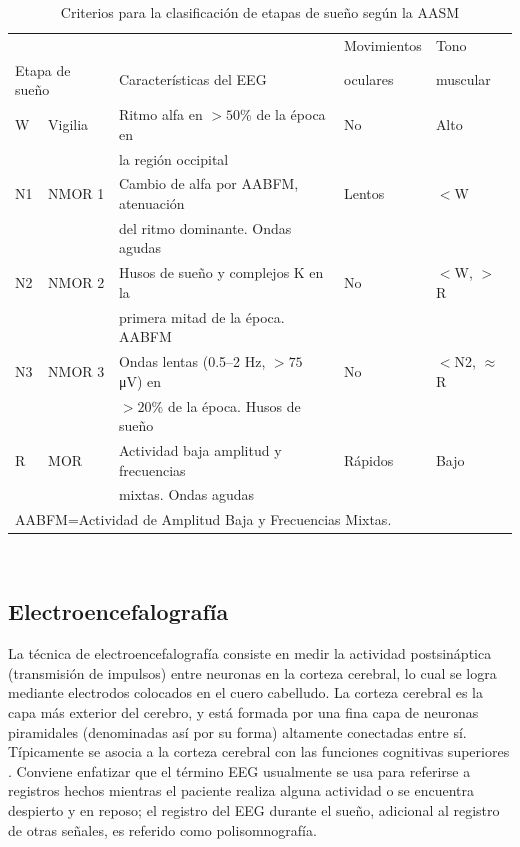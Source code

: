 \documentclass[12pt,letterpaper]{book}
\newcommand{\hz}{\si{\hertz}\xspace}
\newcommand{\mv}{\si{\micro\volt}\xspace}
\begin{document}
\begin{table}
\caption[Criterios para la clasificación de etapas de sueño]
{Criterios para la clasificación de etapas de sueño según la AASM}
\centering
{\small
\begin{tabular}{lllll}
\toprule
&&   & Movimientos & Tono \\
\multicolumn{2}{l}{Etapa de sueño}& Características del EEG & oculares & muscular \\
\midrule
 W  & Vigilia & {Ritmo alfa} en $>50$\% de la época en   & No & Alto \\
    &         & la región occipital                &    &      \\
 N1 & NMOR 1  & Cambio de alfa por AABFM, atenuación & Lentos & $<$W     \\
    &         & del ritmo dominante. Ondas agudas   &    &      \\
 N2 & NMOR 2  & Husos de sueño y complejos K en la    & No & $<$W, $>$R     \\
    &         & primera mitad de la época. AABFM &    &     \\
 N3 & NMOR 3  & {Ondas lentas} (0.5--2 \hz, $>75$ \mv) en& No & $<$N2, $\approx$R \\
    &         & $>20$\% de la época. Husos de sueño       &&      \\
 R  & MOR     & Actividad baja amplitud y frecuencias & Rápidos & Bajo  \\
    &         & mixtas. Ondas agudas             &       &       \\
\bottomrule
\multicolumn{4}{l}{AABFM=Actividad de Amplitud Baja y Frecuencias Mixtas.}
\end{tabular}\\
}
\label{cuadro:aasm}
\end{table}


\subsection{Electroencefalografía}
\label{sec:eeg}

La técnica de electroencefalografía consiste en medir la actividad postsináptica (transmisión de impulsos) entre neuronas en la corteza cerebral, lo cual se logra mediante electrodos colocados en el cuero cabelludo.
%
La corteza cerebral es la capa más exterior del cerebro, y está formada por una fina capa de neuronas piramidales (denominadas así por su forma) altamente conectadas entre sí.
%
Típicamente se asocia a la corteza cerebral con las funciones cognitivas superiores \cite{niedermeyer}.
%
Conviene enfatizar que el término EEG usualmente se usa para referirse a registros hechos mientras el paciente realiza alguna actividad o se encuentra despierto y en reposo; el registro del EEG durante el sueño, adicional al registro de otras señales, es referido como polisomnografía.
\end{document}
